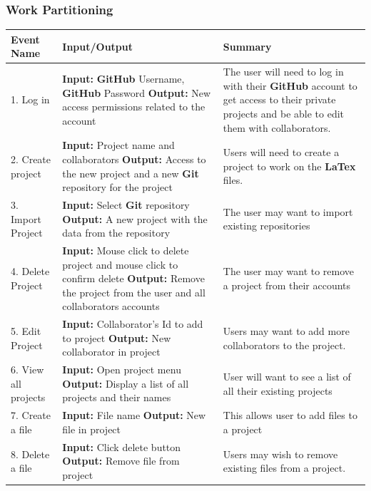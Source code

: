 \documentclass[12pt, titlepage]{article}
\begin{document}
	\subsubsection{Work Partitioning}
	
	\begin{longtable}{|p{4cm}|p{5cm}|p{5cm}|}
		\hline
		\textbf{Event Name} & \textbf{Input/Output} & \textbf{Summary} \\
		\hline
		1. Log in & \textbf{Input:} \textbf{GitHub} Username, \textbf{GitHub} Password \newline \textbf{Output:} New access permissions related to the account & The user will need to log in with their \textbf{GitHub} account to get access to their private projects and be able to edit them with collaborators.\\
		\hline
		2. Create project & \textbf{Input:} Project name and collaborators \newline \textbf{Output:} Access to the new project and a new \textbf{Git} repository for the project & Users will need to create a project to work on the \textbf{LaTex} files.\\
		\hline
		3. Import Project & \textbf{Input:} Select \textbf{Git} repository \newline \textbf{Output:} A new project with the data from the repository & The user may want to import existing repositories\\
		\hline
		4. Delete Project & \textbf{Input:} Mouse click to delete project and mouse click to confirm delete \newline \textbf{Output:} Remove the project from the user and all collaborators accounts & The user may want to remove a project from their accounts\\
		\hline
		5. Edit Project & \textbf{Input:} Collaborator's Id to add to project \newline \textbf{Output:} New collaborator in project & Users may want to add more collaborators to the project.\\
		\hline
		6. View all projects & \textbf{Input:} Open project menu \newline \textbf{Output:} Display a list of all projects and their names & User will want to see a list of all their existing projects\\
		\hline
		7. Create a file & \textbf{Input:} File name \newline \textbf{Output:} New file in project & This allows user to add files to a project\\
		\hline
		8. Delete a file & \textbf{Input:} Click delete button  \newline \textbf{Output:} Remove file from project &  Users may wish to remove existing files from a project.\\

\end{longtable}
\end{document}
